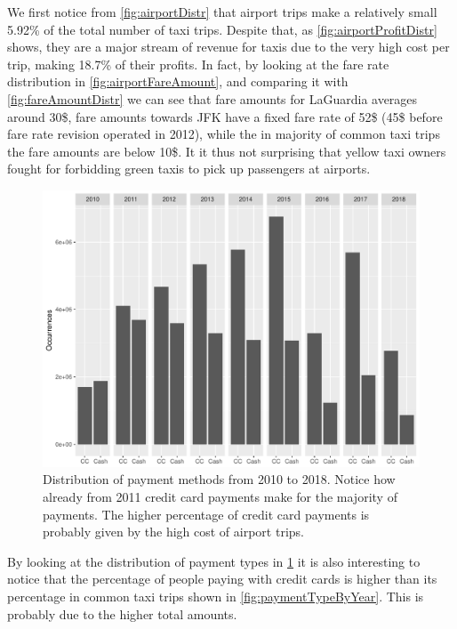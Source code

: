 \documentclass{acm_proc_article-sp-sigmod09}
\begin{document}
We first notice from \cref{fig:airportDistr} that airport trips make a relatively small 5.92\% of the total number of taxi trips. Despite that, as \cref{fig:airportProfitDistr} shows, they are a major stream of revenue for taxis due to the very high cost per trip, making 18.7\% of their profits. In fact, by looking at the fare rate distribution in \cref{fig:airportFareAmount}, and comparing it with \cref{fig:fareAmountDistr} we can see that fare amounts for LaGuardia averages around 30\$, fare amounts towards JFK have a fixed fare rate of 52\$ (45\$ before fare rate revision operated in 2012), while the in majority of common taxi trips the fare amounts are below 10\$. It it thus not surprising that yellow taxi owners fought for forbidding green taxis to pick up passengers at airports.

\begin{figure}
	\centering
	\includegraphics[width=1\columnwidth]{resources/airport/payment_type_distr.pdf}
	\caption{Distribution of payment methods from 2010 to 2018. Notice how already from 2011 credit card payments make for the majority of payments. The higher percentage of credit card payments is probably given by the high cost of airport trips.}
	\label{fig:airportPaymentType}
\end{figure}

By looking at the distribution of payment types in \cref{fig:airportPaymentType} it is also interesting to notice that the percentage of people paying with credit cards is higher than its percentage in common taxi trips shown in \cref{fig:paymentTypeByYear}. This is probably due to the higher total amounts.
\end{document}
